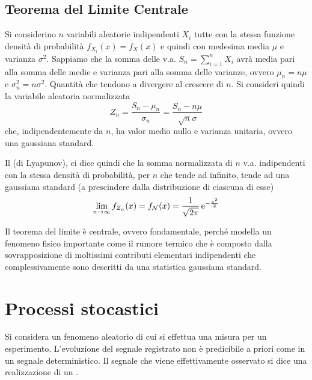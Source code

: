 \section{Teorema del Limite Centrale}
Si considerino $n$ variabili aleatorie indipendenti $X_i$ tutte con la stessa funzione densità di probabilità $f_{X_i}(x)=f_X(x)$ e quindi con medesima media $\mu$ e varianza $\sigma^2$. Sappiamo che la somma delle v.a. $S_n=\sum_{i=1}^{n}X_i$ avrà media pari alla somma delle medie e varianza pari alla somma delle varianze, ovvero $\mu_n=n\mu$ e $\sigma^2_n=n\sigma^2$. Quantità che tendono a divergere al crescere di $n$.
Si consideri quindi la variabile aleatoria normalizzata
\[Z_n=\frac{S_n-\mu_n}{\sigma_n}=\frac{S_n-n\mu}{\sqrt{n}\sigma}\]
che, indipendentemente da $n$, ha valor medio nullo e varianza unitaria, ovvero una gaussiana standard.

Il  (di Lyapunov), ci dice quindi che la somma normalizzata di $n$ v.a. indipendenti con la stessa densità di probabilità, per $n$ che tende ad infinito, tende ad una gaussiana standard (a prescindere dalla distribuzione di ciascuna di esse)
\begin{equation}
\lim\limits_{n\to\infty}f_{Z_n}(x)=f_\mathcal{N}(x)=\frac{1}{\sqrt{2\pi}}\operatorname{e}^{-\frac{x^2}{2}}
\end{equation}
\begin{nota}Il teorema del limite è centrale, ovvero fondamentale, perché modella un fenomeno fisico importante come il rumore termico che è composto dalla sovrapposizione di moltissimi contributi elementari indipendenti che complessivamente sono descritti da una statistica gaussiana standard.\end{nota}

\chapter{Processi stocastici}
Si considera un fenomeno aleatorio di cui si effettua una misura per un esperimento. L'evoluzione del segnale registrato non è predicibile a priori come in un segnale deterministico. Il segnale che viene effettivamente osservato si dice una realizzazione di un .

